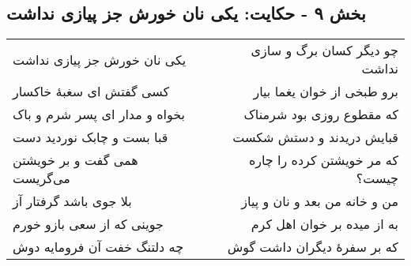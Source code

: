 \begin{center}
\section*{بخش ۹ - حکایت: یکی نان خورش جز پیازی نداشت}
\label{sec:009}
\begin{longtable}{l p{0.5cm} r}
یکی نان خورش جز پیازی نداشت
&&
چو دیگر کسان برگ و سازی نداشت
\\
کسی گفتش ای سغبهٔ خاکسار
&&
برو طبخی از خوان یغما بیار
\\
بخواه و مدار ای پسر شرم و باک
&&
که مقطوع روزی بود شرمناک
\\
قبا بست و چابک نوردید دست
&&
قبایش دریدند و دستش شکست
\\
همی گفت و بر خویشتن می‌گریست
&&
که مر خویشتن کرده را چاره چیست؟
\\
بلا جوی باشد گرفتار آز
&&
من و خانه من بعد و نان و پیاز
\\
جوینی که از سعی بازو خورم
&&
به از میده بر خوان اهل کرم
\\
چه دلتنگ خفت آن فرومایه دوش
&&
که بر سفرهٔ دیگران داشت گوش
\\
\end{longtable}
\end{center}
